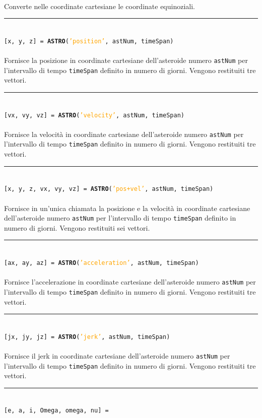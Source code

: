\documentclass[12pt]{article}
\newcommand\method[1]{\textcolor{Orange}{#1}}
\newcommand\class[1]{\textcolor{NavyBlue}{\textbf{#1}}}
\newcommand{\HRule}{\rule{\linewidth}{0.1mm}}
\begin{document}
\\Converte nelle coordinate cartesiane le coordinate equinoziali.
\\
\HRule
\\
{\tt [x, y, z] = \class{ASTRO}(\method{'position'}, astNum, timeSpan)}\\
\\Fornisce la posizione in coordinate cartesiane dell'asteroide numero {\tt astNum} per l'intervallo di tempo {\tt timeSpan} definito in numero di giorni. Vengono restituiti tre vettori.
\\
\HRule
\\
{\tt [vx, vy, vz] = \class{ASTRO}(\method{'velocity'}, astNum, timeSpan)}\\
\\Fornisce la velocità in coordinate cartesiane dell'asteroide numero {\tt astNum} per l'intervallo di tempo {\tt timeSpan} definito in numero di giorni. Vengono restituiti tre vettori.
\\
\HRule
\\
{\tt [x, y, z, vx, vy, vz] = \class{ASTRO}(\method{'pos+vel'}, astNum, timeSpan)}\\
\\Fornisce in un'unica chiamata la posizione e la velocità in coordinate cartesiane dell'asteroide numero {\tt astNum} per l'intervallo di tempo {\tt timeSpan} definito in numero di giorni. Vengono restituiti sei vettori.
\\
\HRule
\\
{\tt [ax, ay, az] = \class{ASTRO}(\method{'acceleration'}, astNum, timeSpan)}\\
\\Fornisce l'accelerazione in coordinate cartesiane dell'asteroide numero {\tt astNum} per l'intervallo di tempo {\tt timeSpan} definito in numero di giorni. Vengono restituiti tre vettori.
\\
\HRule
\\
{\tt [jx, jy, jz] = \class{ASTRO}(\method{'jerk'}, astNum, timeSpan)}\\
\\Fornisce il jerk in coordinate cartesiane dell'asteroide numero {\tt astNum} per l'intervallo di tempo {\tt timeSpan} definito in numero di giorni. Vengono restituiti tre vettori.
\\
\HRule
\\
{\tt [e, a, i, Omega, omega, nu] = \\
\indent{\class{ASTRO}(\method{'evalclassic'}, x, y, z, vx, vy, vz)}}\\
\end{document}
